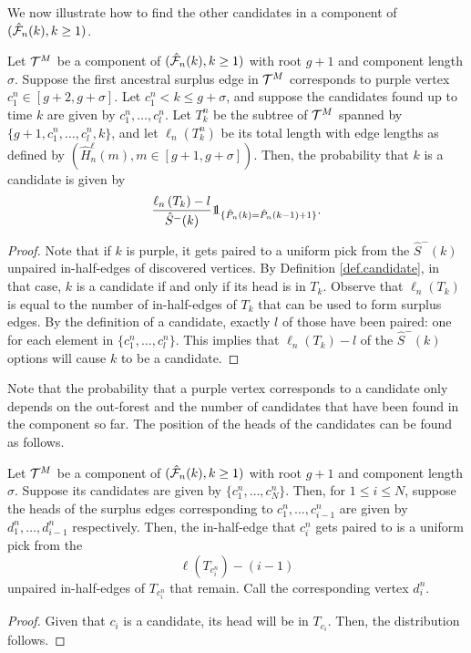 We now illustrate how to find the other candidates in a component of $(\hat{{\mathcal F}}_n(k),k\geq 1)$. 
\begin{lemma}\label{lemma.samplecandidates}
Let ${\mathcal T}^M$ be a component of $(\hat{{\mathcal F}}_n(k),k\geq 1)$ with root $g+1$ and component length $\sigma$. Suppose the first ancestral surplus edge in ${\mathcal T}^M$ corresponds to purple vertex $c^n_1\in [g+2,g+\sigma]$. Let $c^n_1<k\leq g+\sigma$, and suppose the candidates found up to time $k$ are given by $c^n_1,\dots,c^n_l$. Let $T^n_k$ be the subtree of ${\mathcal T}^M$ spanned by $\{g+1,c^n_1,\dots,c^n_l,k\}$, and let $\ell_n(T^n_k)$ be its total length with edge lengths as defined by $(\hat{H}^\ell_n(m),m\in [g+1,g+\sigma])$. Then, the probability that $k$ is a candidate is given by 
$$\frac{\ell_n\left(T_{k}\right)-l}{\hat{S}^-(k)}\one_{\{\hat{P}_n(k)=\hat{P}_n(k-1)+1\}}.$$
\end{lemma}
\begin{proof}
Note that if $k$ is purple, it gets paired to a uniform pick from the $\hat{S}^-(k)$ unpaired in-half-edges of discovered vertices. By Definition \ref{def.candidate}, in that case, $k$ is a candidate if and only if its head is in $T_k$. Observe that $\ell_n\left(T_{k}\right)$ is equal to the number of in-half-edges of $T_{k}$ that can be used to form surplus edges. By the definition of a candidate, exactly $l$ of those have been paired: one for each element in $\{c^n_1,\dots,c^n_l\}$. This implies that $\ell_n\left(T_{k}\right)-l$ of the $\hat{S}^-(k)$ options will cause $k$ to be a candidate.
\end{proof}

Note that the probability that a purple vertex corresponds to a candidate only depends on the out-forest and the number of candidates that have been found in the component so far. The position of the heads of the candidates can be found as follows.
\begin{lemma}\label{lemma.sampleheadcandidates}
Let ${\mathcal T}^M$ be a component of $(\hat{{\mathcal F}}_n(k),k\geq 1)$ with root $g+1$ and component length $\sigma$. Suppose its candidates are given by $\{c^n_1,\dots,c^n_{N}\}$. Then, for $1\leq i\leq {N}$, suppose the heads of the surplus edges corresponding to $c^n_1,\dots,c^n_{i-1}$ are given by $d_1^n,\dots,d^n_{i-1}$ respectively. Then, the in-half-edge that $c^n_{i}$ gets paired to is a uniform pick from the $$\ell\left(T_{c^n_{i}}\right)-(i-1)$$ unpaired in-half-edges of $T_{c^n_{i}}$ that remain. Call the corresponding vertex $d^n_i$.
\end{lemma}
\begin{proof}
Given that $c_{i}$ is a candidate, its head will be in $T_{c_{i}}$. Then, the distribution follows.
\end{proof}

